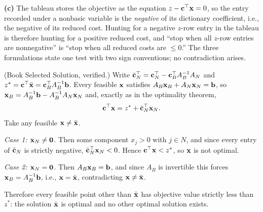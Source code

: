 \textbf{(c)} The tableau stores the objective as the equation
$z - \mathbf{c}^\top\mathbf{x} = 0$, so the entry recorded under a nonbasic variable is
the \emph{negative} of its dictionary coefficient, i.e., the negative of
its reduced cost. Hunting for a negative $z$-row entry in the tableau is
therefore hunting for a positive reduced cost, and ``stop when all
$z$-row entries are nonnegative'' is ``stop when all reduced costs are
$\leq 0$.'' The three formulations state one test with two sign
conventions; no contradiction arises.


(Book Selected Solution, verified.) Write
$\bar{\mathbf{c}}_N^\top = \mathbf{c}_N^\top - \mathbf{c}_B^\top A_B^{-1} A_N$ and
$z^* = \mathbf{c}^\top \bar{\mathbf{x}} = \mathbf{c}_B^\top A_B^{-1} \mathbf{b}$. Every feasible $\mathbf{x}$
satisfies $A_B \mathbf{x}_B + A_N \mathbf{x}_N = \mathbf{b}$, so
$\mathbf{x}_B = A_B^{-1}\mathbf{b} - A_B^{-1}A_N \mathbf{x}_N$ and, exactly as in the optimality
theorem,
\[
\mathbf{c}^\top \mathbf{x} = z^* + \bar{\mathbf{c}}_N^\top \mathbf{x}_N .
\]
Take any feasible $\mathbf{x} \neq \bar{\mathbf{x}}$.

\emph{Case 1: $\mathbf{x}_N \neq \mathbf{0}$.} Then some component $x_j > 0$ with
$j \in N$, and since every entry of $\bar{\mathbf{c}}_N$ is strictly negative,
$\bar{\mathbf{c}}_N^\top \mathbf{x}_N < 0$. Hence $\mathbf{c}^\top \mathbf{x} < z^*$, so $\mathbf{x}$ is not
optimal.

\emph{Case 2: $\mathbf{x}_N = \mathbf{0}$.} Then $A_B \mathbf{x}_B = \mathbf{b}$, and since $A_B$ is
invertible this forces $\mathbf{x}_B = A_B^{-1}\mathbf{b}$, i.e., $\mathbf{x} = \bar{\mathbf{x}}$,
contradicting $\mathbf{x} \neq \bar{\mathbf{x}}$.

Therefore every feasible point other than $\bar{\mathbf{x}}$ has objective value
strictly less than $z^*$: the solution $\bar{\mathbf{x}}$ is optimal and no other
optimal solution exists.
